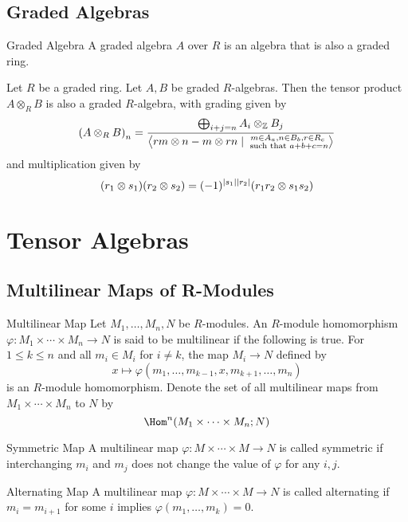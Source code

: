 \documentclass[a4paper]{article}
\begin{document}
\subsection{Graded Algebras}
\begin{defn}{Graded Algebra}{} A graded algebra $A$ over $R$ is an algebra that is also a graded ring. 
\end{defn}

\begin{prp}{}{} Let $R$ be a graded ring. Let $A,B$ be graded $R$-algebras. Then the tensor product $A\otimes_RB$ is also a graded $R$-algebra, with grading given by $$\left(A\otimes_RB\right)_n=\frac{\bigoplus_{i+j=n}A_i\otimes_{\mathbb{Z}} B_j}{\left\langle rm\otimes n-m\otimes rn\;|\;\substack{m\in A_a, n\in B_b, r\in R_c\\\text{ such that }a+b+c=n}\right\rangle}$$ and multiplication given by $$(r_1\otimes s_1)(r_2\otimes s_2)=(-1)^{\abs{s_1}\abs{r_2}}(r_1r_2\otimes s_1s_2)$$
\end{prp}

\pagebreak
\section{Tensor Algebras}
\subsection{Multilinear Maps of R-Modules}
\begin{defn}{Multilinear Map}{} Let $M_1,\dots,M_n,N$ be $R$-modules. An $R$-module homomorphism $\varphi:M_1\times\cdots\times M_n\to N$ is said to be multilinear if the following is true. For $1\leq k\leq n$ and all $m_i\in M_i$ for $i\neq k$, the map $M_i\to N$ defined by $$x\mapsto\varphi(m_1,\dots,m_{k-1},x,m_{k+1},\dots,m_n)$$ is an $R$-module homomorphism. Denote the set of all multilinear maps from $M_1\times\cdots\times M_n$ to $N$ by $$\Hom^n(M_1\times\cdots\times M_n;N)$$
\end{defn}

\begin{defn}{Symmetric Map}{} A multilinear map $\varphi:M\times\cdots\times M\to N$ is called symmetric if interchanging $m_i$ and $m_j$ does not change the value of $\varphi$ for any $i,j$. 
\end{defn}

\begin{defn}{Alternating Map}{} A multilinear map $\varphi:M\times\cdots\times M\to N$ is called alternating if $m_i=m_{i+1}$ for some $i$ implies $\varphi(m_1,\dots,m_k)=0$. 
\end{defn}
\end{document}
